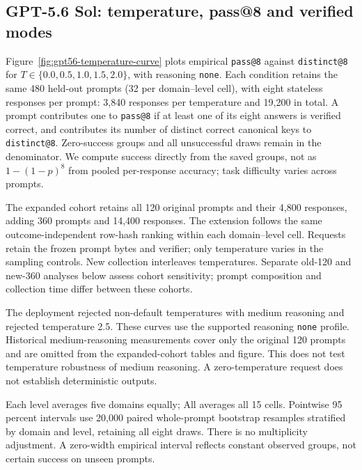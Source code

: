 \subsection{GPT-5.6 Sol: temperature, pass@8 and verified modes}
\label{app:gpt56-temperature}
Figure~\ref{fig:gpt56-temperature-curve} plots empirical \texttt{pass@8}
against \texttt{distinct@8} for $T\in\{0.0,0.5,1.0,1.5,2.0\}$, with reasoning
\texttt{none}. Each condition retains the same 480 held-out prompts
(32 per domain--level cell), with eight stateless responses per prompt:
3,840 responses per temperature and 19,200 in total. A prompt contributes one
to \texttt{pass@8} if at least one of its eight answers is verified correct,
and contributes its number of distinct correct canonical keys to \texttt{distinct@8}.
Zero-success groups and all unsuccessful draws remain in the denominator.
We compute success directly from the saved groups, not as $1-(1-p)^8$
from pooled per-response accuracy; task difficulty varies across prompts.

The expanded cohort retains all 120 original prompts and their 4,800
responses, adding 360 prompts and 14,400 responses. The extension follows
the same outcome-independent row-hash ranking within each domain--level
cell. Requests retain the frozen prompt bytes and verifier; only temperature
varies in the sampling controls. New collection interleaves temperatures.
Separate old-120 and new-360 analyses below assess cohort sensitivity;
prompt composition and collection time differ between these cohorts.

The deployment rejected non-default temperatures with medium reasoning
and rejected temperature 2.5. These curves use the supported reasoning
\texttt{none} profile. Historical medium-reasoning measurements cover only
the original 120 prompts and are omitted from the expanded-cohort tables
and figure. This does not test temperature robustness of medium reasoning.
A zero-temperature request does not establish deterministic outputs.

Each level averages five domains equally; All averages all 15 cells.
Pointwise 95 percent intervals use 20,000 paired whole-prompt bootstrap
resamples stratified by domain and level, retaining all eight draws.
There is no multiplicity adjustment. A zero-width empirical interval
reflects constant observed groups, not certain success on unseen prompts.

